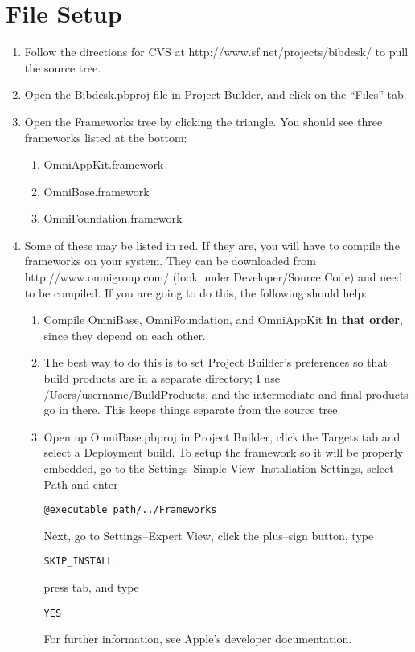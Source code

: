 \documentclass[11pt]{article}
\begin{document}
\section{File Setup}
\begin{enumerate}
\item Follow the directions for CVS at http://www.sf.net/projects/bibdesk/ to pull the source tree.
\item Open the Bibdesk.pbproj file in Project Builder, and click on the ``Files'' tab.
\item Open the Frameworks tree by clicking the triangle.  You should see three frameworks listed at
the bottom:
  \begin{enumerate}
  \item OmniAppKit.framework
  \item OmniBase.framework
  \item OmniFoundation.framework
  \end{enumerate}
\item Some of these may be listed in red.  If they are, you will have to compile the frameworks on
your system.  They can be downloaded from http://www.omnigroup.com/ (look under Developer/Source
Code) and need to be compiled.  If you are going to do this, the following should help:
  \begin{enumerate}
  \item Compile OmniBase, OmniFoundation, and OmniAppKit \textbf{in that order}, since
they depend on each other.
  \item The best way to do this is to set Project Builder's preferences so that build products are in
a separate directory; I use /Users/username/BuildProducts, and the intermediate and final products
go in there.  This keeps things separate from the source tree.
  \item Open up OmniBase.pbproj in Project Builder, click the Targets tab and select a Deployment
build.  To setup the framework so it will be properly embedded, go to the Settings--Simple
View--Installation Settings, select Path and enter
\begin{verbatim}@executable_path/../Frameworks\end{verbatim}  Next, go to Settings--Expert View,
click the plus--sign button, type \begin{verbatim}SKIP_INSTALL\end{verbatim} press tab, and type
\begin{verbatim}YES\end{verbatim}
For further information, see Apple's developer documentation.

\end{enumerate}
\end{enumerate}
\end{document}
